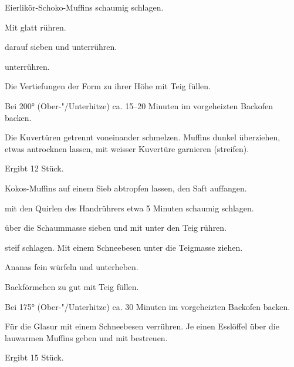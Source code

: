 \begin{recipe}{Eierlikör-Schoko-Muffins}
  schaumig schlagen.

  Mit
  glatt rühren.
  
  darauf sieben und unterrühren.
  
  unterrühren.

  Die Vertiefungen der Form zu  ihrer Höhe mit Teig füllen.
  
  Bei 200° (Ober-"/Unterhitze) ca. 15--20 Minuten im vorgeheizten
  Backofen backen.

  Die Kuvertüren getrennt voneinander schmelzen. Muffins dunkel überziehen,
  etwas antrocknen lassen, mit weisser Kuvertüre garnieren (streifen).

  Ergibt 12 Stück.
\end{recipe}

\begin{recipe}{Kokos-Muffins}
  auf einem Sieb abtropfen lassen, den Saft auffangen.

  mit den Quirlen des Handrührers etwa 5 Minuten schaumig schlagen.

  über die Schaummasse sieben und mit
  unter den Teig rühren.

  steif schlagen. Mit einem Schneebesen unter die Teigmasse ziehen.

  Ananas fein würfeln und unterheben.

  Backförmchen zu gut  mit Teig füllen.

  Bei 175° (Ober-"/Unterhitze) ca. 30 Minuten im vorgeheizten
  Backofen backen.

  Für die Glasur
  mit einem Schneebesen verrühren. Je einen Esslöffel über die lauwarmen
  Muffins geben und mit
  bestreuen.

  Ergibt 15 Stück.
\end{recipe}

